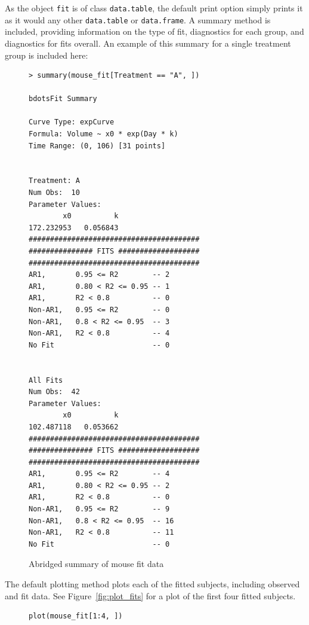 \documentclass{article}
\newcommand{\xt}{\texttt}%
\begin{document}
As the object \xt{fit} is of class \xt{data.table}, the default print option simply prints it as it would any other \xt{data.table} or \xt{data.frame}. A summary method is included, providing information on the type of fit, diagnostics for each group, and diagnostics for fits overall. An example of this summary for a single treatment group is included here:

\begin{singlespace}
\begin{figure}[H]
\centering
\begin{BVerbatim}
> summary(mouse_fit[Treatment == "A", ])

bdotsFit Summary

Curve Type: expCurve 
Formula: Volume ~ x0 * exp(Day * k) 
Time Range: (0, 106) [31 points]


Treatment: A 
Num Obs:  10 
Parameter Values: 
        x0          k 
172.232953   0.056843 
########################################
############### FITS ###################
########################################
AR1,       0.95 <= R2        -- 2 
AR1,       0.80 < R2 <= 0.95 -- 1 
AR1,       R2 < 0.8          -- 0 
Non-AR1,   0.95 <= R2        -- 0 
Non-AR1,   0.8 < R2 <= 0.95  -- 3 
Non-AR1,   R2 < 0.8          -- 4 
No Fit                       -- 0 


All Fits 
Num Obs:  42 
Parameter Values: 
        x0          k 
102.487118   0.053662 
########################################
############### FITS ###################
########################################
AR1,       0.95 <= R2        -- 4 
AR1,       0.80 < R2 <= 0.95 -- 2 
AR1,       R2 < 0.8          -- 0 
Non-AR1,   0.95 <= R2        -- 9 
Non-AR1,   0.8 < R2 <= 0.95  -- 16 
Non-AR1,   R2 < 0.8          -- 11 
No Fit                       -- 0 
\end{BVerbatim}
\caption{Abridged summary of mouse fit data}
\end{figure}
\end{singlespace}

The default plotting method plots each of the fitted subjects, including observed and fit data. See Figure~\ref{fig:plot_fits} for a plot of the first four fitted subjects.

\begin{singlespace}
\begin{figure}[H]
\centering
\begin{BVerbatim}
plot(mouse_fit[1:4, ])
\end{BVerbatim}
\end{figure}
\end{singlespace}
\end{document}
